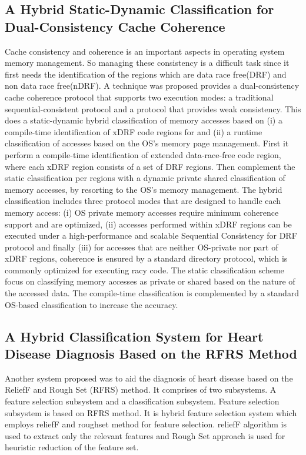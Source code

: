\documentclass[10pt,a4paper,journal]{IEEEtran}
\begin{document}
\subsection{A Hybrid Static-Dynamic Classification for Dual-Consistency Cache Coherence}
\hspace{2em}
Cache consistency and coherence is an important aspects in operating system memory management. So managing these consistency is a difficult task since it first needs the identification of the regions which are data race free(DRF) and non data race free(nDRF). A technique was proposed\cite{9} provides a dual-consistency cache coherence protocol that supports two execution modes: a traditional sequential-consistent protocol\cite{10} and a protocol that provides weak consistency\cite{11}. This does a static-dynamic hybrid classification of memory accesses based on (i) a compile-time identification of xDRF code regions for and (ii) a runtime classification of accesses based on the OS’s memory page management.  First it perform a compile-time identification of extended data-race-free code region, where each xDRF region consists of a set of DRF regions. Then complement the static classification per regions with a dynamic private shared classification of memory accesses, by resorting to the OS’s memory management. The hybrid classification includes three protocol modes that are designed to handle each memory access: (i) OS private memory accesses require minimum coherence support and are optimized, (ii) accesses performed within xDRF regions can be executed under a high-performance and scalable Sequential Consistency for DRF protocol and finally (iii) for accesses that are neither OS-private nor part of xDRF regions, coherence is ensured by a standard directory protocol, which is commonly optimized for executing racy code. The static  classification scheme focus on classifying memory accesses as private or shared based on the nature of the accessed data. The compile-time classification is complemented by a standard OS-based classification to increase the accuracy.\\

\subsection{A Hybrid Classification System for Heart Disease Diagnosis Based on the RFRS Method}
\hspace{2em}
Another system proposed\cite{12} was to aid the diagnosis of heart disease based on the ReliefF and Rough Set (RFRS) method. It comprises of two subsystems. A feature selection subsystem and a classification subsystem. Feature selection subsystem is based on RFRS method. It is hybrid feature selection system which employs reliefF\cite{13} and roughset method for feature selection. reliefF algorithm is used to extract only the relevant features and Rough Set approach is used for heuristic reduction of the feature set.\\
\end{document}
